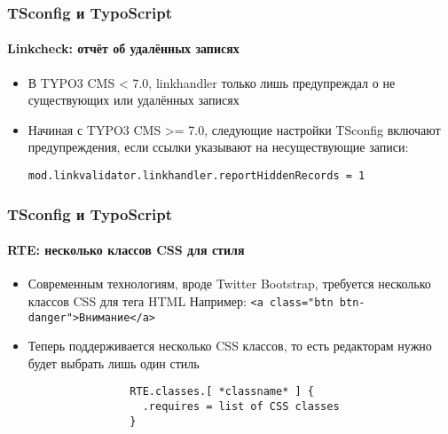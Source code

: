 
\begin{frame}[fragile]
	\frametitle{TSconfig и TypoScript}
	\framesubtitle{Linkcheck: отчёт об удалённых записях}

	\begin{itemize}
		\item В TYPO3 CMS < 7.0, linkhandler только лишь предупреждал о не существующих или удалённых записях
		\item Начиная с TYPO3 CMS >=  7.0, следующие настройки TSconfig включают предупреждения, если ссылки указывают на
		несуществующие записи:

			\lstinline!mod.linkvalidator.linkhandler.reportHiddenRecords = 1!

	\end{itemize}

\end{frame}


\begin{frame}[fragile]
	\frametitle{TSconfig и TypoScript}
	\framesubtitle{RTE: несколько классов CSS для стиля}

	\begin{itemize}
		\item Современным технологиям, вроде Twitter Bootstrap, требуется несколько классов CSS для тега HTML\newline
			\small Например: \texttt{<a class="btn btn-danger">Внимание</a>}\normalsize
		\item Теперь поддерживается несколько CSS классов, то есть редакторам нужно будет выбрать лишь один стиль

			\begin{lstlisting}
				RTE.classes.[ *classname* ] {
				  .requires = list of CSS classes
				}
			\end{lstlisting}

	\end{itemize}

\end{frame}


